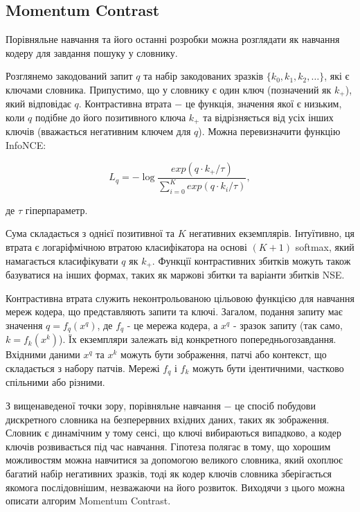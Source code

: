 \vspace{1.5em}

\subsection{Momentum Contrast}

Порівняльне навчання та його останні розробки можна розглядати як навчання кодеру для завдання пошуку у словнику.

Розглянемо закодований запит $q$ та набір закодованих зразків $\{k_{0}, k_{1}, k_{2}, \dots\}$, які є ключами словника. Припустимо, що у словнику є один ключ (позначений як $k_{+}$), який відповідає $q$. Контрастивна втрата $-$ це функція, значення якої є низьким, коли $q$ подібне до його позитивного ключа $k_{+}$ та відрізняється від усіх інших ключів (вважається негативним ключем для $q$). Можна перевизначити функцію InfoNCE:

\begin{equation}\label{eq:infonce_simple}
L_{q} = -\log{\frac{exp(q \cdot k_{+}/\tau)}{\sum_{i=0}^{K}{exp(q \cdot k_{i}/\tau)}}},
\end{equation}

\vspace{1.5em}

\noindent де $\tau$ гіперпараметр. 

Сума складається з однієї позитивної та $K$ негативних екземплярів. Інтуїтивно, ця втрата є логаріфмічною втратою класифікатора на основі $(K + 1)$ softmax, який намагається класифікувати $q$ як $k_{+}$. Функції контрастивних збитків можуть також базуватися на інших формах, таких як маржові збитки та варіанти збитків NSE.

Контрастивна втрата служить неконтрольованою цільовою функцією для навчання мереж кодера, що представляють запити та ключі. Загалом, подання запиту має значення $q = f_{q} (x^{q})$, де $f_{q}$ - це мережа кодера, а $x^{q}$ - зразок запиту (так само, $k = f_{k} (x^{k})$). Їх екземпляри залежать від конкретного попередньогозавдання. Вхідними даними $x^{q}$ та $x^{k}$ можуть бути зображення, патчі або контекст, що складається з набору патчів. Мережі $f_{q}$ і $f_{k}$ можуть бути ідентичними, частково спільними або різними.

З вищенаведеної точки зору, порівняльне навчання $-$ це спосіб побудови дискретного словника на безперервних вхідних даних, таких як зображення. Словник є динамічним у тому сенсі, що ключі вибираються випадково, а кодер ключів розвивається під час навчання. Гіпотеза полягає в тому, що хорошим можливостям можна навчитися за допомогою великого словника, який охоплює багатий набір негативних зразків, тоді як кодер ключів словника зберігається якомога послідовнішим, незважаючи на його розвиток. Виходячи з цього можна описати алгорим Momentum Contrast.

